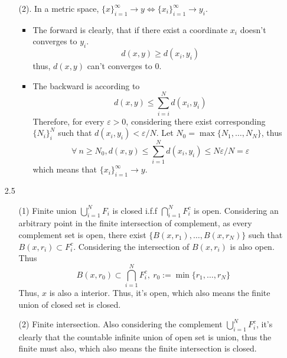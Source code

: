 \documentclass{article}
\begin{document}
\begin{enumerate}
\begin{enumerate}
        \item[(2).] In a metric space, \({\{x\}}_{i = 1}^\infty \to y \iff {\{x_i\}}_{i = 1}^\infty \to y_i\).
            \begin{itemize}
                \item The forward is clearly, that if there exist a coordinate \(x_i\) doesn't converges to \(y_i\).
                    \[d(x, y) \ge d(x_i, y_i)\]
                    thus, \(d(x, y)\) can't converges to 0.
                \item The backward is according to 
                    \[d(x, y) \le \sum_{i = i}^{N} d(x_i, y_i)\]
                    Therefore, for every \(\varepsilon > 0\), considering there exist corresponding \({\{N_i\}}_i^N\) such that \(d(x_i, y_i) < \varepsilon/N\). Let \(N_0 = \max\{N_1, \dots, N_N\}\), thus
                    \[\forall\ n \ge N_0, d(x, y) \le \sum_{i = 1}^{N} d(x_i, y_i) \le N \varepsilon/N = \varepsilon\]
                    which means that \({\{x_i\}}_{i = 1}^\infty \to y\).
            \end{itemize}
    \end{enumerate}



\item[2.5]
    \begin{enumerate}
        \item[(1)] Finite union \(\bigcup_{i = 1}^N F_i\) is closed i.f.f \(\bigcap_{i = 1}^N F_i^c\) is open.
            Considering an arbitrary point in the finite intersection of complement, as every complement set is open, there exist \(\{B(x, r_1), \ldots, B(x, r_N)\}\) such that \(B(x, r_i) \subset F_i^c \). Considering the intersection of \(B(x, r_i)\) is also open. Thus 
            \[B(x, r_0) \subset \bigcap_{i = 1}^N F_i^c,\ r_0 := \min\{r_1, \ldots, r_N\}\]
            Thus, \(x\) is also a interior. Thus, it's open, which also means the finite union of closed set is closed.
            
        \item[(2)] Finite intersection. Also considering the complement \(\bigcup_{i = 1}^N F_i^c\), it's clearly that the countable infinite union of open set is union, thus the finite must also, which also means the finite intersection is closed.
    \end{enumerate}

\end{enumerate}
\end{document}

